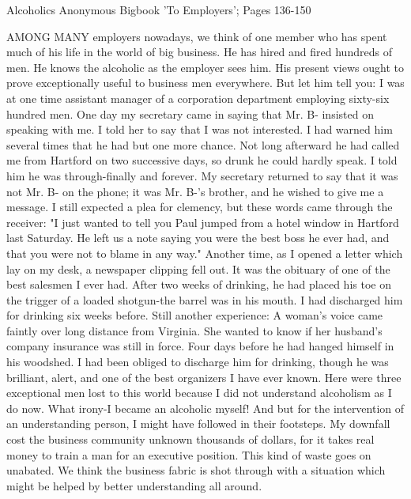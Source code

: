 
Alcoholics Anonymous Bigbook 'To Employers'; Pages 136-150

\begin{biblechapter}
AMONG MANY employers nowadays, we think of one member who has spent much of his life in the world of big business.  He has hired and fired hundreds of men.  He knows the alcoholic as the employer sees him.  His present views ought to prove exceptionally useful to business men everywhere. 
But let him tell you:
I was at one time assistant manager of a corporation department employing sixty-six hundred men.  One day my secretary came in saying that Mr. B- insisted on speaking with me.  I told her to say that I was not interested.  I had warned him several times that he had but one more chance.  Not long afterward he had called me from Hartford on two successive days, so drunk he could hardly speak.  I told him he was through-finally and forever.
My secretary returned to say that it was not Mr. B- on the phone; it was Mr. B-'s brother, and he wished to give me a message.  I still expected a plea for clemency, but these words came through the receiver:  "I just wanted to tell you Paul jumped from a hotel window in Hartford last Saturday.  He left us a note saying you were the best boss he ever had, and that you were not to blame in any way."
Another time, as I opened a letter which lay on my desk, a newspaper clipping fell out.  It was the obituary of one of the best salesmen I ever had.  After two weeks of drinking, he had placed his toe on the trigger of a loaded shotgun-the barrel was in his mouth.  I had discharged him for drinking six weeks before.
Still another experience:  A woman's voice came faintly over long distance from Virginia.  She wanted to know if her husband's company insurance was still in force.  Four days before he had hanged himself in his woodshed.  I had been obliged to discharge him for drinking, though he was brilliant, alert, and one of the best organizers I have ever known.
Here were three exceptional men lost to this world because I did not understand alcoholism as I do now.  What irony-I became an alcoholic myself!  And but for the intervention of an understanding person, I might have followed in their footsteps.  My downfall cost the business community unknown thousands of dollars, for it takes real money to train a man for an executive position.  This kind of waste goes on unabated.  We think the business fabric is shot through with a situation which might be helped by better understanding all around. 

\end{biblechapter}
